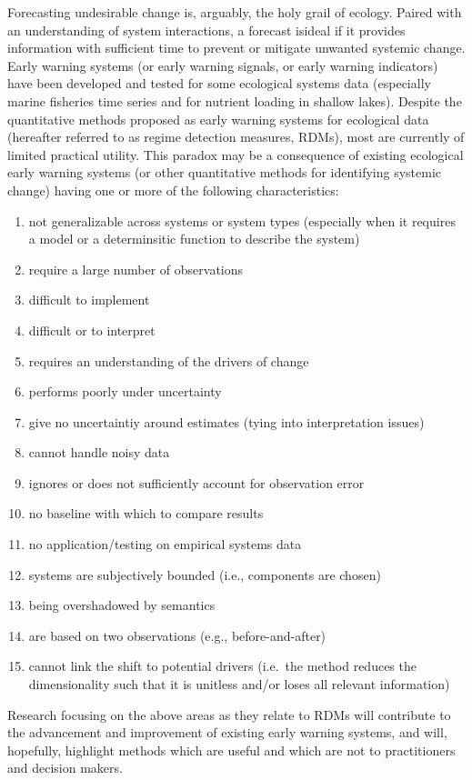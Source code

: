 \documentclass[12pt,twoside,openany]{reedthesis}
\providecommand{\tightlist}{%
  \setlength{\itemsep}{0pt}\setlength{\parskip}{0pt}}
\begin{document}
Forecasting undesirable change is, arguably, the holy grail of ecology. Paired with an understanding of system interactions, a forecast isideal if it provides information with sufficient time to prevent or mitigate unwanted systemic change. Early warning systems (or early warning signals, or early warning indicators) have been developed and tested for some ecological systems data (especially marine fisheries time series and for nutrient loading in shallow lakes). Despite the quantitative methods proposed as early warning systems for ecological data (hereafter referred to as regime detection measures, RDMs), most are currently of limited practical utility. This paradox may be a consequence of existing ecological early warning systems (or other quantitative methods for identifying systemic change) having one or more of the following characteristics:
\begin{enumerate}
\def\labelenumi{\arabic{enumi}.}
\tightlist
\item
  not generalizable across systems or system types (especially when it requires a model or a determinsitic function to describe the system)
\item
  require a large number of observations
\item
  difficult to implement
\item
  difficult or to interpret
\item
  requires an understanding of the drivers of change
\item
  performs poorly under uncertainty
\item
  give no uncertaintiy around estimates (tying into interpretation issues)
\item
  cannot handle noisy data
\item
  ignores or does not sufficiently account for observation error
\item
  no baseline with which to compare results
\item
  no application/testing on empirical systems data
\item
  systems are subjectively bounded (i.e., components are chosen)
\item
  being overshadowed by semantics
\item
  are based on two observations (e.g., before-and-after)
\item
  cannot link the shift to potential drivers (i.e.~the method reduces the dimensionality such that it is unitless and/or loses all relevant information)
\end{enumerate}
Research focusing on the above areas as they relate to RDMs will contribute to the advancement and improvement of existing early warning systems, and will, hopefully, highlight methods which are useful and which are not to practitioners and decision makers.
\end{document}
